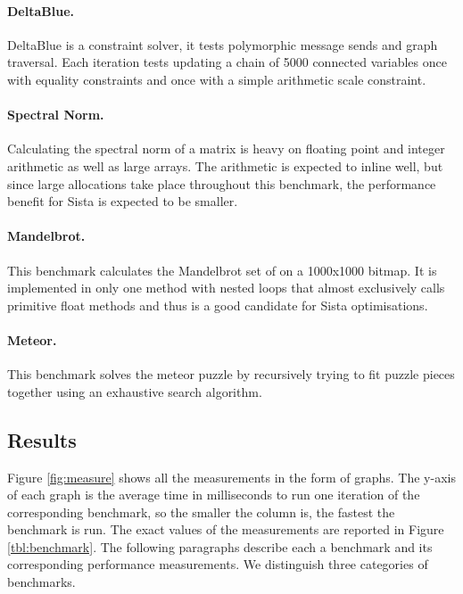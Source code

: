 \documentclass[a4paper,12pt,twoside]{../includes/ThesisStyle}
\begin{document}
	\paragraph{DeltaBlue.}DeltaBlue is a constraint solver, it tests polymorphic message sends and graph traversal. Each iteration tests updating a chain of 5000 connected variables once with equality constraints and once with a simple arithmetic scale constraint.

	\paragraph{Spectral Norm.}Calculating the spectral norm of a matrix is heavy on floating point and integer arithmetic as well as large arrays. The arithmetic is expected to inline well, but since large allocations take place throughout this benchmark, the performance benefit for Sista is expected to be smaller.

	\paragraph{Mandelbrot.}This benchmark calculates the Mandelbrot set of on a 1000x1000 bitmap. It is implemented in only one method with nested loops that almost exclusively calls primitive float methods and thus is a good candidate for Sista optimisations.

	\paragraph{Meteor.}This benchmark solves the meteor puzzle by recursively trying to fit puzzle pieces together using an exhaustive search algorithm.

\subsection{Results}

Figure \ref{fig:measure} shows all the measurements in the form of graphs. The y-axis of each graph is the average time in milliseconds to run one iteration of the corresponding benchmark, so the smaller the column is, the fastest the benchmark is run. The exact values of the measurements are reported in Figure \ref{tbl:benchmark}. The following paragraphs describe each a benchmark and its corresponding performance measurements. We distinguish three categories of benchmarks.
\end{document}
